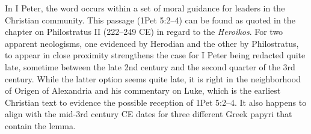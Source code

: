 In I Peter, the word occurs within a set of moral guidance for leaders in the Christian community. %
This passage (1Pet 5:2--4) can be found as quoted in the chapter on Philostratus II (222--249 CE) in regard to the \textit{Heroikos}. %
For two apparent neologisms, one evidenced by Herodian and the other by Philostratus, %
to appear in close proximity strengthens the case for I Peter being redacted quite late, %
sometime between the late 2nd century and the second quarter of the 3rd century. %
While the latter option seems quite late, %
it is right in the neighborhood of Origen of Alexandria and his commentary on Luke, %
which is the earliest Christian text to evidence the possible reception of 1Pet 5:2--4. %
It also happens to align with the mid-3rd century CE dates for three different Greek papyri %
that contain the lemma. \\[1.5mm] %


